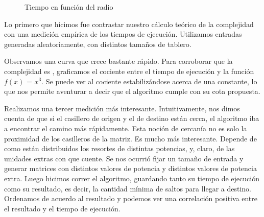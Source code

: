 \documentclass[11pt, a4paper, twoside]{article}
\begin{document}
{}

\begin{figure}[H]\begin{center}
\end{center}\caption{Tiempo en función del radio}\end{figure}

\begin{center}\fixme{}\end{center}

Lo primero que hicimos fue contrastar nuestro cálculo teórico de la complejidad con una medición empírica de los tiempos de ejecución. Utilizamos entradas generadas aleatoriamente, con distintos tamaños de tablero. 


Observamos una curva que crece bastante rápido. Para corroborar que la complejidad es , graficamos el cociente entre el tiempo de ejecución y la función $f(x)$ = $x^3$. Se puede ver al cociente estabilizándose acerca de una constante, lo que nos permite aventurar a decir que el algoritmo cumple con su cota propuesta.

Realizamos una tercer medición más interesante. Intuitivamente, nos dimos cuenta de que si el casillero de origen y el de destino están cerca, el algoritmo iba a encontrar el camino más rápidamente. Esta noción de cercanía no es solo la proximidad de los casilleros de la matriz. Es mucho más interesante. Depende de como están distribuidos los resortes de distintas potencias, y, claro, de las unidades extras con que cuente. Se nos ocurrió fijar un tamaño de entrada y generar matrices con distintos valores de potencia y distintos valores de potencia extra. Luego hicimos correr el algoritmo, guardando tanto su tiempo de ejecución como su resultado, es decir, la cantidad mínima de saltos para llegar a destino. Ordenamos de acuerdo al resultado y podemos ver una correlación positiva entre el resultado y el tiempo de ejecución. 
\end{document}
